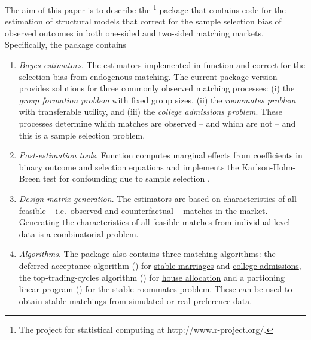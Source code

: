 The aim of this paper is to describe the \footnote{The  project for statistical computing \citep{RCoreTeam2014} at http://www.r-project.org/.} package  \citep{Klein2015b} that contains  code for the estimation of structural models that correct for the sample selection bias of observed outcomes in both one-sided and two-sided matching markets. 
Specifically, the  package contains
\begin{enumerate}
\item \textit{Bayes estimators}. The estimators implemented in function  and  correct for the selection bias from endogenous matching. The current package version provides solutions for three commonly observed matching processes: 
(i) the \textit{group formation problem} with fixed group sizes, 
(ii) the \textit{roommates problem} with transferable utility, and
(iii) the \textit{college admissions problem}.
These processes determine which matches are observed -- and which are not -- and this is a sample selection problem.

\item \textit{Post-estimation tools}. Function  computes marginal effects from coefficients in binary outcome and selection equations and  implements the Karlson-Holm-Breen test for confounding due to sample selection \citep{Karlson2012}.

\item \textit{Design matrix generation}. The estimators are based on characteristics of all feasible -- i.e.\ observed and counterfactual -- matches in the market. Generating the characteristics of all feasible matches from individual-level data is a combinatorial problem. %

\item \textit{Algorithms}. The package also contains three matching algorithms: the deferred acceptance algorithm () for \href{http://en.wikipedia.org/wiki/Stable_matching}{stable marriages} and \href{http://en.wikipedia.org/wiki/Hospital_resident}{college admissions}, the top-trading-cycles algorithm () for \href{http://en.wikipedia.org/wiki/Herbert_Scarf#8._The_Housing_Market}{house allocation} and a partioning linear program () for the \href{http://en.wikipedia.org/wiki/Stable_roommates_problem}{stable roommates problem}. These can be used to obtain stable matchings from simulated or real preference data. 


\end{enumerate}
